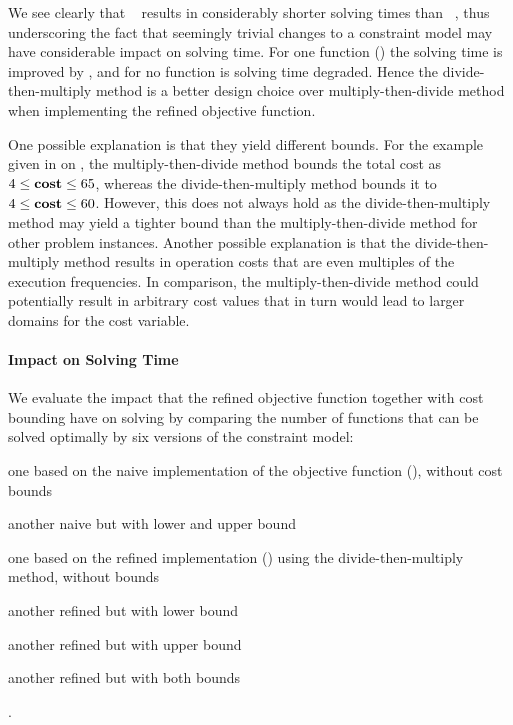 We see clearly that ~
results in considerably shorter solving times than ~, thus underscoring the fact that seemingly
trivial changes to a \gls{constraint model} may have considerable impact on
solving time.
%
For one \gls{function} () the solving time is
improved by
\printZCNorm{%
  \NewOpCostFunVsOldPrePlusSolvingTimeSpeedupPrePlusSolvingTimeZeroCenteredSpeedupMax%
}, and for no \gls{function} is solving time degraded.
%
Hence the \gls{divide-then-multiply method} is a better design choice over
\gls{multiply-then-divide method} when implementing the refined \gls{objective
  function}.

One possible explanation is that they yield different bounds.
%
For the example given in  on
, the \gls{multiply-then-divide method} bounds the
total cost as \mbox{$4 \leq \mVar{cost} \leq 65$}, whereas the
\gls{divide-then-multiply method} bounds it to \mbox{$4 \leq \mVar{cost} \leq
  60$}.
%
However, this does not always hold as the \gls{divide-then-multiply method} may
yield a tighter bound than the \gls{multiply-then-divide method} for other
problem instances.
%
Another possible explanation is that the \gls{divide-then-multiply method}
results in \gls{operation} costs that are even multiples of the execution
frequencies.
%
In comparison, the \gls{multiply-then-divide method} could potentially result in
arbitrary cost values that in turn would lead to larger \glspl{domain} for the
\gls{cost variable}.


\paragraph{Impact on Solving Time}

We evaluate the impact that the refined \gls{objective function} together with
cost bounding have on solving by comparing the number of \glspl{function} that
can be solved optimally by six versions of the \gls{constraint model}:
%
\begin{modelList}
  \item {}
    one based on the naive implementation of the \gls{objective function}
    (), without cost bounds
  \item {}
    another naive  but with lower and upper bound
  \item {}
    one based on the refined implementation
    () using the
    \gls{divide-then-multiply method}, without bounds
  \item {}
    another refined  but with lower bound
  \item {}
    another refined  but with upper bound
  \item {}
    another refined  but with both bounds
\end{modelList}.

